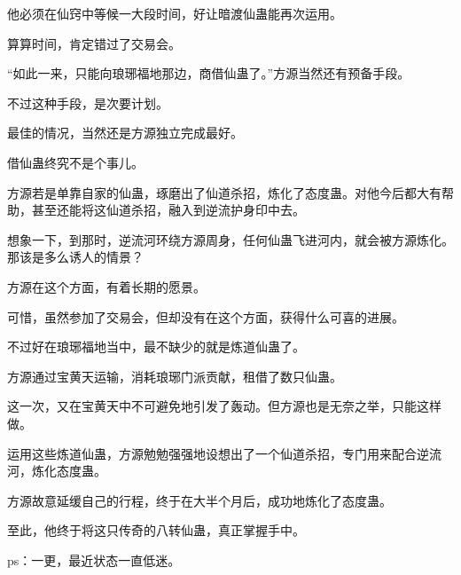 \begin{this_body}
他必须在仙窍中等候一大段时间，好让暗渡仙蛊能再次运用。

算算时间，肯定错过了交易会。

“如此一来，只能向琅琊福地那边，商借仙蛊了。”方源当然还有预备手段。

不过这种手段，是次要计划。

最佳的情况，当然还是方源独立完成最好。

借仙蛊终究不是个事儿。

方源若是单靠自家的仙蛊，琢磨出了仙道杀招，炼化了态度蛊。对他今后都大有帮助，甚至还能将这仙道杀招，融入到逆流护身印中去。

想象一下，到那时，逆流河环绕方源周身，任何仙蛊飞进河内，就会被方源炼化。那该是多么诱人的情景？

方源在这个方面，有着长期的愿景。

可惜，虽然参加了交易会，但却没有在这个方面，获得什么可喜的进展。

不过好在琅琊福地当中，最不缺少的就是炼道仙蛊了。

方源通过宝黄天运输，消耗琅琊门派贡献，租借了数只仙蛊。

这一次，又在宝黄天中不可避免地引发了轰动。但方源也是无奈之举，只能这样做。

运用这些炼道仙蛊，方源勉勉强强地设想出了一个仙道杀招，专门用来配合逆流河，炼化态度蛊。

方源故意延缓自己的行程，终于在大半个月后，成功地炼化了态度蛊。

至此，他终于将这只传奇的八转仙蛊，真正掌握手中。

ps：一更，最近状态一直低迷。

\end{this_body}

